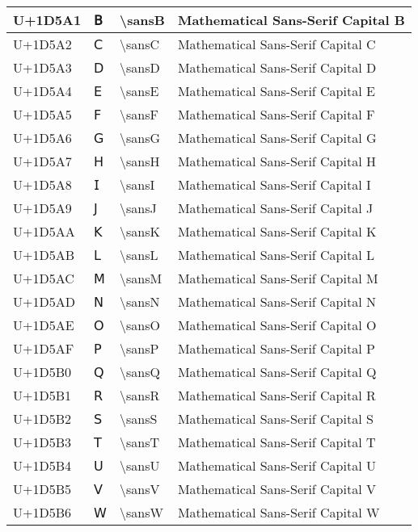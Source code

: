 \begin{table}[h]
\begin{tabulary}{\linewidth}{|L|L|L|L|}
\hline
U+1D5A1 & 𝖡 & {\textbackslash}sansB & Mathematical Sans-Serif Capital B \\
\hline
U+1D5A2 & 𝖢 & {\textbackslash}sansC & Mathematical Sans-Serif Capital C \\
\hline
U+1D5A3 & 𝖣 & {\textbackslash}sansD & Mathematical Sans-Serif Capital D \\
\hline
U+1D5A4 & 𝖤 & {\textbackslash}sansE & Mathematical Sans-Serif Capital E \\
\hline
U+1D5A5 & 𝖥 & {\textbackslash}sansF & Mathematical Sans-Serif Capital F \\
\hline
U+1D5A6 & 𝖦 & {\textbackslash}sansG & Mathematical Sans-Serif Capital G \\
\hline
U+1D5A7 & 𝖧 & {\textbackslash}sansH & Mathematical Sans-Serif Capital H \\
\hline
U+1D5A8 & 𝖨 & {\textbackslash}sansI & Mathematical Sans-Serif Capital I \\
\hline
U+1D5A9 & 𝖩 & {\textbackslash}sansJ & Mathematical Sans-Serif Capital J \\
\hline
U+1D5AA & 𝖪 & {\textbackslash}sansK & Mathematical Sans-Serif Capital K \\
\hline
U+1D5AB & 𝖫 & {\textbackslash}sansL & Mathematical Sans-Serif Capital L \\
\hline
U+1D5AC & 𝖬 & {\textbackslash}sansM & Mathematical Sans-Serif Capital M \\
\hline
U+1D5AD & 𝖭 & {\textbackslash}sansN & Mathematical Sans-Serif Capital N \\
\hline
U+1D5AE & 𝖮 & {\textbackslash}sansO & Mathematical Sans-Serif Capital O \\
\hline
U+1D5AF & 𝖯 & {\textbackslash}sansP & Mathematical Sans-Serif Capital P \\
\hline
U+1D5B0 & 𝖰 & {\textbackslash}sansQ & Mathematical Sans-Serif Capital Q \\
\hline
U+1D5B1 & 𝖱 & {\textbackslash}sansR & Mathematical Sans-Serif Capital R \\
\hline
U+1D5B2 & 𝖲 & {\textbackslash}sansS & Mathematical Sans-Serif Capital S \\
\hline
U+1D5B3 & 𝖳 & {\textbackslash}sansT & Mathematical Sans-Serif Capital T \\
\hline
U+1D5B4 & 𝖴 & {\textbackslash}sansU & Mathematical Sans-Serif Capital U \\
\hline
U+1D5B5 & 𝖵 & {\textbackslash}sansV & Mathematical Sans-Serif Capital V \\
\hline
U+1D5B6 & 𝖶 & {\textbackslash}sansW & Mathematical Sans-Serif Capital W \\

\end{tabulary}
\end{table}
